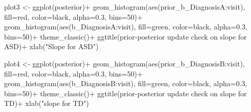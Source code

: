 \documentclass[
]{article}
\newenvironment{Shaded}{\begin{snugshade}}{\end{snugshade}}
\newcommand{\AttributeTok}[1]{\textcolor[rgb]{0.77,0.63,0.00}{#1}}
\newcommand{\DecValTok}[1]{\textcolor[rgb]{0.00,0.00,0.81}{#1}}
\newcommand{\FloatTok}[1]{\textcolor[rgb]{0.00,0.00,0.81}{#1}}
\newcommand{\FunctionTok}[1]{\textcolor[rgb]{0.00,0.00,0.00}{#1}}
\newcommand{\NormalTok}[1]{#1}
\newcommand{\OtherTok}[1]{\textcolor[rgb]{0.56,0.35,0.01}{#1}}
\newcommand{\SpecialCharTok}[1]{\textcolor[rgb]{0.00,0.00,0.00}{#1}}
\newcommand{\StringTok}[1]{\textcolor[rgb]{0.31,0.60,0.02}{#1}}
\begin{document}
\begin{Shaded}
\begin{Highlighting}[]
\NormalTok{plot3 }\OtherTok{\textless{}{-}} \FunctionTok{ggplot}\NormalTok{(posterior)}\SpecialCharTok{+}
  \FunctionTok{geom\_histogram}\NormalTok{(}\FunctionTok{aes}\NormalTok{(}\StringTok{\textasciigrave{}}\AttributeTok{prior\_b\_DiagnosisA:visit}\StringTok{\textasciigrave{}}\NormalTok{), }\AttributeTok{fill=}\StringTok{\textquotesingle{}red\textquotesingle{}}\NormalTok{, }\AttributeTok{color=}\StringTok{\textquotesingle{}black\textquotesingle{}}\NormalTok{, }\AttributeTok{alpha=}\FloatTok{0.3}\NormalTok{, }\AttributeTok{bins=}\DecValTok{50}\NormalTok{)}\SpecialCharTok{+}
  \FunctionTok{geom\_histogram}\NormalTok{(}\FunctionTok{aes}\NormalTok{(}\StringTok{\textasciigrave{}}\AttributeTok{b\_DiagnosisA:visit}\StringTok{\textasciigrave{}}\NormalTok{), }\AttributeTok{fill=}\StringTok{\textquotesingle{}green\textquotesingle{}}\NormalTok{, }\AttributeTok{color=}\StringTok{\textquotesingle{}black\textquotesingle{}}\NormalTok{, }\AttributeTok{alpha=}\FloatTok{0.3}\NormalTok{, }\AttributeTok{bins=}\DecValTok{50}\NormalTok{)}\SpecialCharTok{+}
  \FunctionTok{theme\_classic}\NormalTok{()}\SpecialCharTok{+}
  \FunctionTok{ggtitle}\NormalTok{(}\StringTok{\textquotesingle{}prior{-}posterior update check on slope for ASD\textquotesingle{}}\NormalTok{)}\SpecialCharTok{+}
  \FunctionTok{xlab}\NormalTok{(}\StringTok{"Slope for ASD"}\NormalTok{)}

\NormalTok{plot4 }\OtherTok{\textless{}{-}} \FunctionTok{ggplot}\NormalTok{(posterior)}\SpecialCharTok{+}
  \FunctionTok{geom\_histogram}\NormalTok{(}\FunctionTok{aes}\NormalTok{(}\StringTok{\textasciigrave{}}\AttributeTok{prior\_b\_DiagnosisB:visit}\StringTok{\textasciigrave{}}\NormalTok{), }\AttributeTok{fill=}\StringTok{\textquotesingle{}red\textquotesingle{}}\NormalTok{, }\AttributeTok{color=}\StringTok{\textquotesingle{}black\textquotesingle{}}\NormalTok{, }\AttributeTok{alpha=}\FloatTok{0.3}\NormalTok{, }\AttributeTok{bins=}\DecValTok{50}\NormalTok{)}\SpecialCharTok{+}
  \FunctionTok{geom\_histogram}\NormalTok{(}\FunctionTok{aes}\NormalTok{(}\StringTok{\textasciigrave{}}\AttributeTok{b\_DiagnosisB:visit}\StringTok{\textasciigrave{}}\NormalTok{), }\AttributeTok{fill=}\StringTok{\textquotesingle{}green\textquotesingle{}}\NormalTok{, }\AttributeTok{color=}\StringTok{\textquotesingle{}black\textquotesingle{}}\NormalTok{, }\AttributeTok{alpha=}\FloatTok{0.3}\NormalTok{, }\AttributeTok{bins=}\DecValTok{50}\NormalTok{)}\SpecialCharTok{+}
  \FunctionTok{theme\_classic}\NormalTok{()}\SpecialCharTok{+}
  \FunctionTok{ggtitle}\NormalTok{(}\StringTok{\textquotesingle{}prior{-}posterior update check on slope for TD\textquotesingle{}}\NormalTok{)}\SpecialCharTok{+}
  \FunctionTok{xlab}\NormalTok{(}\StringTok{"slope for TD"}\NormalTok{)}



\end{Highlighting}
\end{Shaded}
\end{document}
